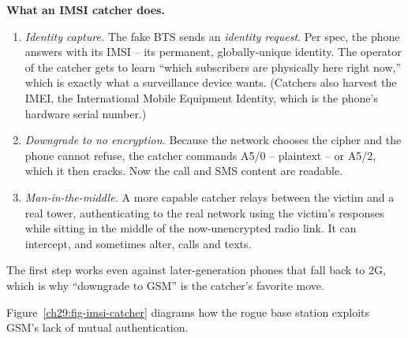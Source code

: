 \begin{attackbox}
\textbf{What an IMSI catcher does.}
\begin{enumerate}
  \item \emph{Identity capture.} The fake BTS sends an \emph{identity request}. Per spec, the phone answers with its IMSI -- its permanent, globally-unique identity. The operator of the catcher gets to learn ``which subscribers are physically here right now,'' which is exactly what a surveillance device wants. (Catchers also harvest the IMEI, the International Mobile Equipment Identity, which is the phone's hardware serial number.)
  \item \emph{Downgrade to no encryption.} Because the network chooses the cipher and the phone cannot refuse, the catcher commands A5/0 -- plaintext -- or A5/2, which it then cracks. Now the call and SMS content are readable.
  \item \emph{Man-in-the-middle.} A more capable catcher relays between the victim and a real tower, authenticating to the real network using the victim's responses while sitting in the middle of the now-unencrypted radio link. It can intercept, and sometimes alter, calls and texts.
\end{enumerate}
The first step works even against later-generation phones that fall back to 2G, which is why ``downgrade to GSM'' is the catcher's favorite move.
\end{attackbox}

Figure~\ref{ch29:fig-imsi-catcher} diagrams how the rogue base station exploits GSM's lack of mutual authentication.

